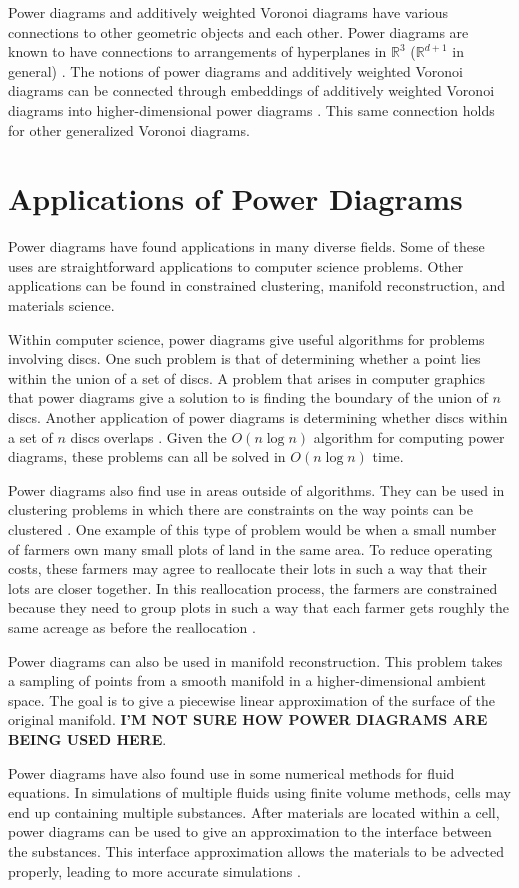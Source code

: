 \documentclass[a4paper]{article}
\newcommand{\R}{\mathbb{R}}
\begin{document}
Power diagrams and additively weighted Voronoi diagrams have various connections to other geometric objects and each other.
Power diagrams are known to have connections to arrangements of hyperplanes in $\R^3$ ($\R^{d+1}$ in general) \cite{aurenhammer_survey}. The notions
of power diagrams and additively weighted Voronoi diagrams can be connected through embeddings of additively weighted Voronoi diagrams into
higher-dimensional power diagrams \cite{aurenhammer_additive}. This same connection holds for other generalized Voronoi diagrams.

\section{Applications of Power Diagrams}

Power diagrams have found applications in many diverse fields. Some of these uses are straightforward applications to computer science problems. Other
applications can be found in constrained clustering, manifold reconstruction, and materials science.

Within computer science, power diagrams give useful algorithms for problems involving discs. One such problem is that of determining whether a point
lies within the union of a set of discs. A problem that arises in computer graphics that power diagrams give a solution to is finding the boundary of
the union of $n$ discs. \cite{imai_power} Another application of power diagrams is determining whether discs within a set of $n$ discs overlaps
\cite{aurenhammer_discs}. Given the $O(n \log n)$ algorithm for computing power diagrams, these problems can all be solved in $O(n \log n)$ time.

Power diagrams also find use in areas outside of algorithms. They can be used in clustering problems in which there are constraints on the way points
can be clustered \cite{brieden_clustering}. One example of this type of problem would be when a small number of farmers own many small plots of land
in the same area. To reduce operating costs, these farmers may agree to reallocate their lots in such a way that their lots are closer together. In
this reallocation process, the farmers are constrained because they need to group plots in such a way that each farmer gets roughly the same acreage
as before the reallocation \cite{brieden_farmland}.

Power diagrams can also be used in manifold reconstruction. This problem takes a sampling of points from a smooth manifold in a higher-dimensional
ambient space. The goal is to give a piecewise linear approximation of the surface of the original manifold. \textbf{I'M NOT SURE HOW POWER DIAGRAMS
ARE BEING USED HERE}.

Power diagrams have also found use in some numerical methods for fluid equations. In simulations of multiple fluids using finite volume methods, cells
may end up containing multiple substances. After materials are located within a cell, power diagrams can be used to give an approximation to the
interface between the substances. This interface approximation allows the materials to be advected properly, leading to more accurate simulations
\cite{fluids}.

\printbibliography
\end{document}
